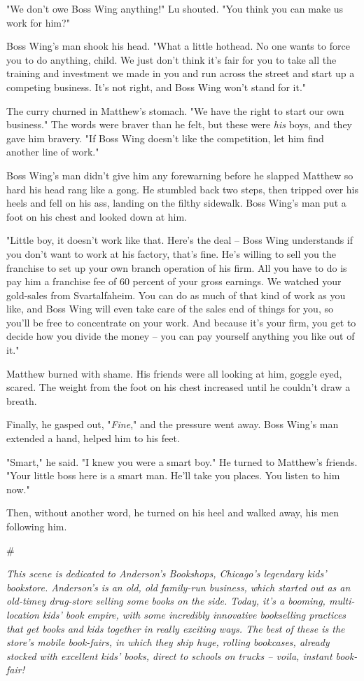 "We don't owe Boss Wing anything!" Lu shouted. "You think you can
make us work for him?"

Boss Wing's man shook his head. "What a little hothead. No one
wants to force you to do anything, child. We just don't think it's
fair for you to take all the training and investment we made in you
and run across the street and start up a competing business. It's
not right, and Boss Wing won't stand for it."

The curry churned in Matthew's stomach. "We have the right to start
our own business." The words were braver than he felt, but these
were \emph{his} boys, and they gave him bravery. "If Boss Wing
doesn't like the competition, let him find another line of work."

Boss Wing's man didn't give him any forewarning before he slapped
Matthew so hard his head rang like a gong. He stumbled back two
steps, then tripped over his heels and fell on his ass, landing on
the filthy sidewalk. Boss Wing's man put a foot on his chest and
looked down at him.

"Little boy, it doesn't work like that. Here's the deal -- Boss
Wing understands if you don't want to work at his factory, that's
fine. He's willing to sell you the franchise to set up your own
branch operation of his firm. All you have to do is pay him a
franchise fee of 60 percent of your gross earnings. We watched your
gold-sales from Svartalfaheim. You can do as much of that kind of
work as you like, and Boss Wing will even take care of the sales
end of things for you, so you'll be free to concentrate on your
work. And because it's your firm, you get to decide how you divide
the money -- you can pay yourself anything you like out of it."

Matthew burned with shame. His friends were all looking at him,
goggle eyed, scared. The weight from the foot on his chest
increased until he couldn't draw a breath.

Finally, he gasped out, "\emph{Fine}," and the pressure went away.
Boss Wing's man extended a hand, helped him to his feet.

"Smart," he said. "I knew you were a smart boy." He turned to
Matthew's friends. "Your little boss here is a smart man. He'll
take you places. You listen to him now."

Then, without another word, he turned on his heel and walked away,
his men following him.

\#

\emph{This scene is dedicated to Anderson's Bookshops, Chicago's legendary kids' bookstore. Anderson's is an old, old family-run business, which started out as an old-timey drug-store selling some books on the side. Today, it's a booming, multi-location kids' book empire, with some incredibly innovative bookselling practices that get books and kids together in really exciting ways. The best of these is the store's mobile book-fairs, in which they ship huge, rolling bookcases, already stocked with excellent kids' books, direct to schools on trucks -- voila, instant book-fair!}

